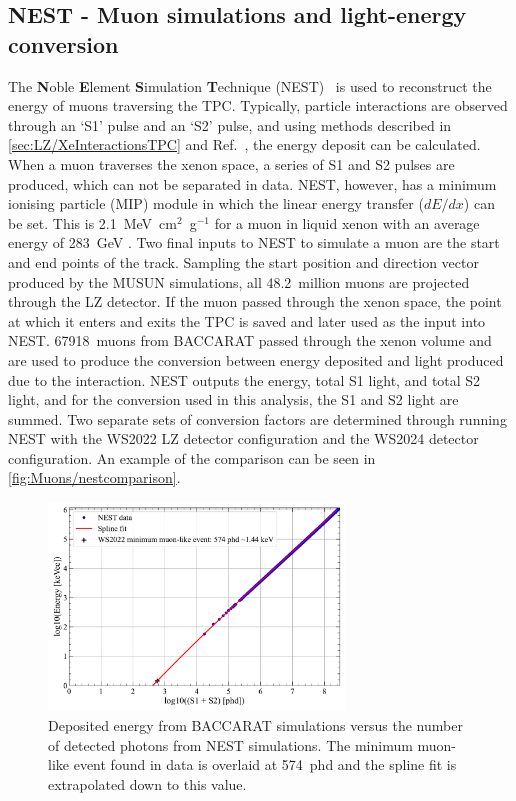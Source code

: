 \subsection{NEST - Muon simulations and light-energy conversion}\label{sec:Muons/MuonFluxNEST}
The \textbf{N}oble \textbf{E}lement \textbf{S}imulation \textbf{T}echnique (NEST)~\cite{NEST2011} is used to reconstruct the energy of muons traversing the TPC. Typically, particle interactions are observed through an `S1' pulse and an `S2' pulse, and using methods described in \autoref{sec:LZ/XeInteractionsTPC} and Ref.~\cite{NEST2011}, the energy deposit can be calculated. When a muon traverses the xenon space, a series of S1 and S2 pulses are produced, which can not be separated in data. NEST, however, has a minimum ionising particle (MIP) module in which the linear energy transfer ($dE/dx$) can be set. This is 2.1~MeV~cm$^2$~g$^{-1}$ for a muon in liquid xenon with an average energy of 283~GeV \cite{MUE}. Two final inputs to NEST to simulate a muon are the start and end points of the track.
Sampling the start position and direction vector produced by the MUSUN simulations, all 48.2~million muons are projected through the LZ detector. If the muon passed through the xenon space, the point at which it enters and exits the TPC is saved and later used as the input into NEST. 67918~muons from BACCARAT passed through the xenon volume and are used to produce the conversion between energy deposited and light produced due to the interaction. NEST outputs the energy, total S1 light, and total S2 light, and for the conversion used in this analysis, the S1 and S2 light are summed.
Two separate sets of conversion factors are determined through running NEST with the WS2022 LZ detector configuration and the WS2024 detector configuration. An example of the comparison can be seen in \autoref{fig:Muons/nestcomparison}.
\begin{figure}[h!]
    \centering
    \includegraphics[width=0.7\textwidth]{figures/Muons/TPCEnergyConversion.pdf}
    \caption[Deposited energy from BACCARAT simulations versus the number of detected photons from NEST simulations.]{Deposited energy from BACCARAT simulations versus the number of detected photons from NEST simulations. The minimum muon-like event found in data is overlaid at 574~phd and the spline fit is extrapolated down to this value.}
    \label{fig:Muons/nestcomparison}
\end{figure}
